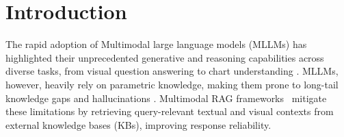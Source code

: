 \section{Introduction}

The rapid adoption of Multimodal large language models (MLLMs) has highlighted their unprecedented generative and reasoning capabilities across diverse tasks, from visual question answering to chart understanding \citep{tsimpoukelli2021multimodal, lu2022dynamic, chart2023}. MLLMs, however, heavily rely on parametric knowledge, making them prone to long-tail knowledge gaps \citep{asai2024reliable} and hallucinations \citep{ye2022unreliability}. Multimodal RAG frameworks~\cite{chen2022murag, yasunaga2022retrieval, chen2024mllm} mitigate these limitations by retrieving query-relevant textual and visual contexts from external knowledge bases (KBs), improving response reliability. 



